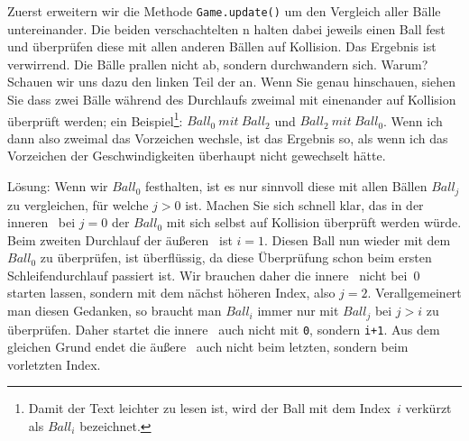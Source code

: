 Zuerst erweitern wir die Methode \texttt{Game.update()} um den Vergleich aller Bälle untereinander. Die beiden verschachtelten \forSchleife n halten dabei jeweils einen Ball fest und überprüfen diese mit allen anderen Bällen auf Kollision. Das Ergebnis ist verwirrend. Die Bälle prallen nicht ab, sondern durchwandern sich. Warum? Schauen wir uns dazu den linken Teil der  an. Wenn Sie genau hinschauen, siehen Sie dass zwei Bälle während des Durchlaufs zweimal mit einenander auf Kollision überprüft werden; ein Beispiel\footnote{Damit der Text leichter zu lesen ist, wird der Ball mit dem Index~$i$ verkürzt als $Ball_i$ bezeichnet.}: $Ball_0~mit~Ball_2$ und $Ball_2~mit~Ball_0$. Wenn ich dann also zweimal das Vorzeichen wechsle, ist das Ergebnis so, als wenn ich das Vorzeichen der Geschwindigkeiten überhaupt nicht gewechselt hätte.


Lösung: Wenn wir $Ball_0$ festhalten, ist es nur sinnvoll diese mit allen Bällen $Ball_j$ zu vergleichen, für welche $j > 0$ ist. Machen Sie sich schnell klar, das in der inneren \forSchleife\ bei $j=0$ der $Ball_0$ mit sich selbst auf Kollision überprüft werden würde. Beim zweiten Durchlauf der äußeren \forSchleife\ ist $i = 1$. Diesen Ball nun wieder mit dem $Ball_0$ zu überprüfen, ist überflüssig, da diese Überprüfung schon beim ersten Schleifendurchlauf passiert ist. Wir brauchen daher die innere \forSchleife\ nicht bei~0 starten lassen, sondern mit dem nächst höheren Index, also $j = 2$. Verallgemeinert man diesen Gedanken, so braucht man $Ball_i$ immer nur mit $Ball_j$ bei $j > i$ zu überprüfen. Daher startet die innere \forSchleife\ auch nicht mit \texttt{0}, sondern \texttt{i+1}. Aus dem gleichen Grund endet die äußere \forSchleife\ auch nicht beim letzten, sondern beim vorletzten Index.


